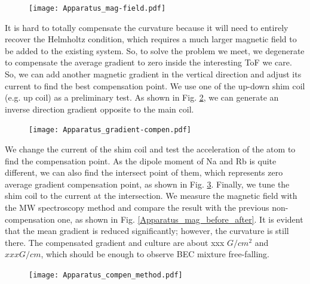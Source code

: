 \begin{figure}[htbp]
\begin{center}
\texttt{[image: Apparatus\_mag-field.pdf]}
\end{center}
\caption[]{}
\label{Apparatus_mag-field}
\end{figure}

It is hard to totally compensate the curvature because it will need to entirely recover the Helmholtz condition, which requires a much larger magnetic field to be added to the existing system. So, to solve the problem we meet, we degenerate to compensate the average gradient to zero inside the interesting ToF we care. So, we can add another magnetic gradient in the vertical direction and adjust its current to find the best compensation point. We use one of the up-down shim coil (e.g. up coil) as a preliminary test. As shown in Fig. \ref{Apparatus_gradient-compen}, we can generate an inverse direction gradient opposite to the main coil. 

\begin{figure}[htbp]
\begin{center}
\texttt{[image: Apparatus\_gradient-compen.pdf]}
\end{center}
\caption[]{}
\label{Apparatus_gradient-compen}
\end{figure}

We change the current of the shim coil and test the acceleration of the atom to find the compensation point. As the dipole moment of Na and Rb is quite different, we can also find the intersect point of them, which represents zero average gradient compensation point, as shown in Fig. \ref{Apparatus_compen_method}. Finally, we tune the shim coil to the current at the intersection. We measure the magnetic field with the MW spectroscopy method and compare the result with the previous non-compensation one, as shown in Fig. \ref{Apparatus_mag_before_after}. It is evident that the mean gradient is reduced significantly; however, the curvature is still there. The compensated gradient and culture are about xxx \(G/cm^2\) and \(xxx G/cm\), which should be enough to observe BEC mixture free-falling.

\begin{figure}[htbp]
\begin{center}
\texttt{[image: Apparatus\_compen\_method.pdf]}
\end{center}
\caption[]{}
\label{Apparatus_compen_method}
\end{figure}

